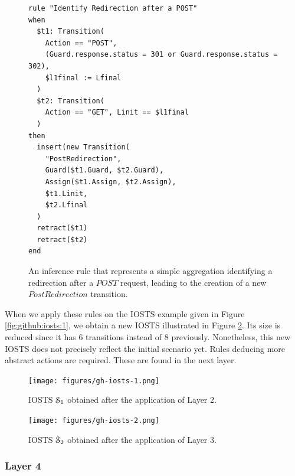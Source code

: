 \begin{figure}
\begin{framed}
\begin{BVerbatim}
rule "Identify Redirection after a POST"
when
  $t1: Transition(
    Action == "POST",
    (Guard.response.status = 301 or Guard.response.status = 302),
    $l1final := Lfinal
  )
  $t2: Transition(
    Action == "GET", Linit == $l1final
  )
then
  insert(new Transition(
    "PostRedirection",
    Guard($t1.Guard, $t2.Guard),
    Assign($t1.Assign, $t2.Assign),
    $t1.Linit,
    $t2.Lfinal
  )
  retract($t1)
  retract($t2)
end
\end{BVerbatim}
\end{framed}

\caption{An inference rule that represents a simple aggregation
identifying a redirection after a $POST$ request, leading to the
creation of a new $PostRedirection$ transition.}
\label{fig:rule:redirect}
\end{figure}


\begin{example}
When we apply these rules on the IOSTS example given in Figure
\ref{fig:github:iosts:1}, we obtain a new IOSTS illustrated in
Figure \ref{fig:github:iosts:2}. Its size is reduced since it has
6 transitions instead of 8 previously. Nonetheless, this new
IOSTS does not precisely reflect the initial scenario yet. Rules
deducing more abstract actions are required. These are found in
the next layer.

\begin{figure}[h]
\begin{minipage}{.5\textwidth}
    \texttt{[image: figures/gh-iosts-1.png]}

    \caption{IOSTS $\EuScript{S}_1$ obtained after the
    application of Layer 2.}
    \label{fig:github:iosts:1}
\end{minipage}
\begin{minipage}{.5\textwidth}
    \texttt{[image: figures/gh-iosts-2.png]}

    \caption{IOSTS $\EuScript{S}_2$ obtained after the
    application of Layer 3.}
    \label{fig:github:iosts:2}
\end{minipage}
\end{figure}
\end{example}

\subsubsection{Layer 4}

